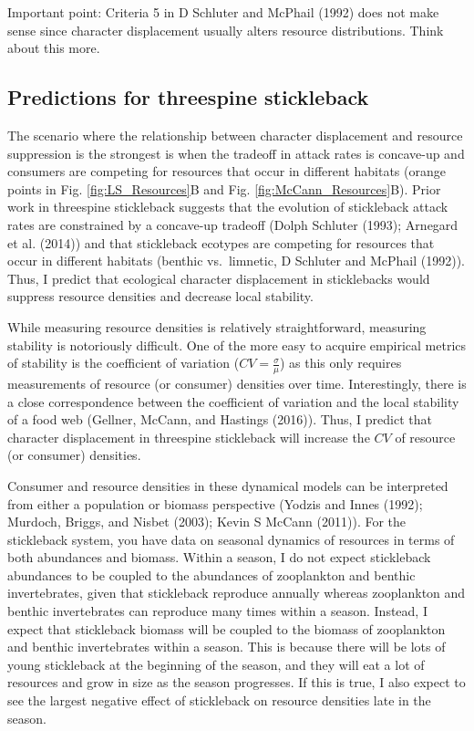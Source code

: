 \documentclass[11pt,]{article}
\begin{document}
Important point: Criteria 5 in D Schluter and McPhail (1992) does not
make sense since character displacement usually alters resource
distributions. Think about this more.

\subsection{Predictions for threespine
stickleback}\label{predictions-for-threespine-stickleback}

The scenario where the relationship between character displacement and
resource suppression is the strongest is when the tradeoff in attack
rates is concave-up and consumers are competing for resources that occur
in different habitats (orange points in Fig. \ref{fig:LS_Resources}B and
Fig. \ref{fig:McCann_Resources}B). Prior work in threespine stickleback
suggests that the evolution of stickleback attack rates are constrained
by a concave-up tradeoff (Dolph Schluter (1993); Arnegard et al. (2014))
and that stickleback ecotypes are competing for resources that occur in
different habitats (benthic vs.~limnetic, D Schluter and McPhail
(1992)). Thus, I predict that ecological character displacement in
sticklebacks would suppress resource densities and decrease local
stability.

While measuring resource densities is relatively straightforward,
measuring stability is notoriously difficult. One of the more easy to
acquire empirical metrics of stability is the coefficient of variation
(\(CV=\frac{\sigma}{\mu}\)) as this only requires measurements of
resource (or consumer) densities over time. Interestingly, there is a
close correspondence between the coefficient of variation and the local
stability of a food web (Gellner, McCann, and Hastings (2016)). Thus, I
predict that character displacement in threespine stickleback will
increase the \(CV\) of resource (or consumer) densities.

Consumer and resource densities in these dynamical models can be
interpreted from either a population or biomass perspective (Yodzis and
Innes (1992); Murdoch, Briggs, and Nisbet (2003); Kevin S McCann
(2011)). For the stickleback system, you have data on seasonal dynamics
of resources in terms of both abundances and biomass. Within a season, I
do not expect stickleback abundances to be coupled to the abundances of
zooplankton and benthic invertebrates, given that stickleback reproduce
annually whereas zooplankton and benthic invertebrates can reproduce
many times within a season. Instead, I expect that stickleback biomass
will be coupled to the biomass of zooplankton and benthic invertebrates
within a season. This is because there will be lots of young stickleback
at the beginning of the season, and they will eat a lot of resources and
grow in size as the season progresses. If this is true, I also expect to
see the largest negative effect of stickleback on resource densities
late in the season.
\end{document}
